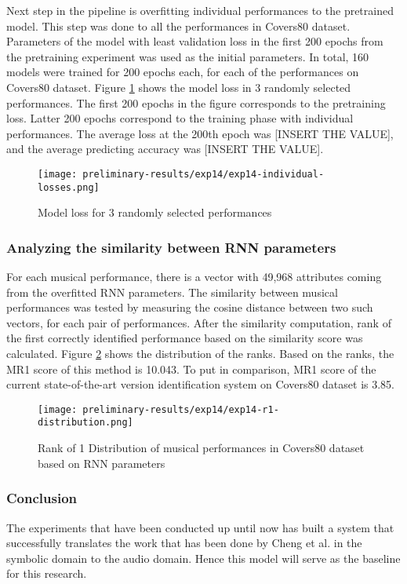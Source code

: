 \documentclass[../main.tex]{subfiles}
\begin{document}
\par
Next step in the pipeline is overfitting individual performances to the pretrained model. This step was done to all the performances in Covers80 dataset. Parameters of the model with least validation loss in the first 200 epochs from the pretraining experiment was used as the initial parameters. In total, 160 models were trained for 200 epochs each, for each of the performances on Covers80 dataset. Figure \ref{fig:exp14-performance} shows the model loss in 3 randomly selected performances. The first 200 epochs in the figure corresponds to the pretraining loss. Latter 200 epochs correspond to the training phase with individual performances. The average loss at the 200th epoch was [INSERT THE VALUE], and the average predicting accuracy was [INSERT THE VALUE].


\begin{figure}[h]
    \centering
    \texttt{[image: preliminary-results/exp14/exp14-individual-losses.png]}
    \caption{Model loss for 3 randomly selected performances}
    \label{fig:exp14-performance}
\end{figure}


\subsubsection{Analyzing the similarity between RNN parameters}

\par
For each musical performance, there is a vector with 49,968 attributes coming from the overfitted \gls{RNN} parameters. The similarity between musical performances was tested by measuring the cosine distance between two such vectors, for each pair of performances. After the similarity computation, rank of the first correctly identified performance based on the similarity score was calculated. Figure \ref{fig:exp14-r1-distribution} shows the distribution of the ranks. Based on the ranks, the \gls{MR1} score of this method is 10.043. To put in comparison, \gls{MR1} score of the current state-of-the-art version identification system \cite{jiang_yang_chen_2020} on Covers80 dataset is 3.85.

\begin{figure}[h]
    \centering
    \texttt{[image: preliminary-results/exp14/exp14-r1-distribution.png]}
    \caption{Rank of 1 Distribution of musical performances in Covers80 dataset based on RNN parameters}
    \label{fig:exp14-r1-distribution}
\end{figure}

\subsubsection{Conclusion}

\par
The experiments that have been conducted up until now has built a system that successfully translates the work that has been done by Cheng et al. in the symbolic domain \cite{tian_cheng_comparing_2018} to the audio domain. Hence this model will serve as the baseline for this research.
\end{document}
